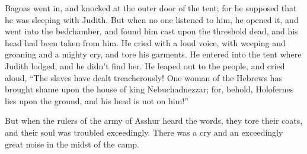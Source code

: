 {Bagoas went in, and knocked at the outer door of the tent; for he supposed that he was sleeping with Judith.
But when no one listened to him, he opened it, and went into the bedchamber, and found him cast upon the threshold dead, and his head had been taken from him.
He cried with a loud voice, with weeping and groaning and a mighty cry, and tore his garments.
He entered into the tent where Judith lodged, and he didn’t find her. He leaped out to the people, and cried aloud,
“The slaves have dealt treacherously! One woman of the Hebrews has brought shame upon the house of king Nebuchadnezzar; for, behold, Holofernes lies upon the ground, and his head is not on him!”
\par }{\PP {}But when the rulers of the army of Asshur heard the words, they tore their coats, and their soul was troubled exceedingly. There was a cry and an exceedingly great noise in the midst of the camp.

}
